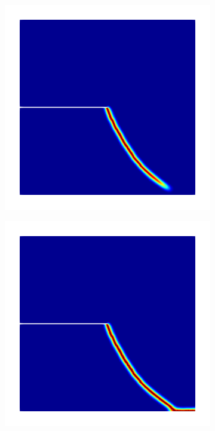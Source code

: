 \begin{figure}[htb!]
\begin{subfigure}[b]{0.21\textwidth}
    \end{subfigure}
    \begin{subfigure}[b]{0.21\textwidth}
        \centering
        \includegraphics[width=\textwidth,scale=0.5]{past/figures/mode2_notched_plate_spectral_intermediate.png}
    \end{subfigure}
    \begin{subfigure}[b]{0.21\textwidth}
        \centering
        \includegraphics[width=\textwidth,scale=0.5]{past/figures/mode2_notched_plate_spectral_final.png}

\end{subfigure}
\end{figure}
